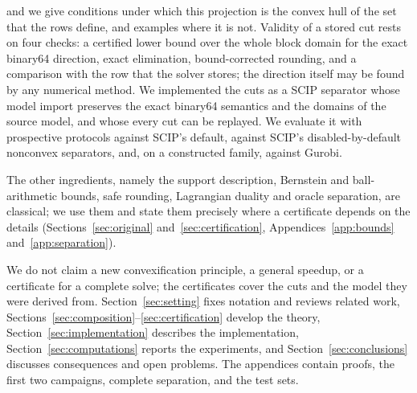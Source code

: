 \begin{itemize}
and we give conditions under which this projection is the convex hull of the
set that the rows define, and examples where it is not. Validity of a stored
cut rests on four checks: a certified lower bound over the whole block domain
for the exact binary64 direction, exact elimination, bound-corrected rounding,
and a comparison with the row that the solver stores; the direction itself may
be found by any numerical method. We implemented the cuts as a SCIP separator
whose model import preserves the exact binary64 semantics and the domains of
the source model, and whose every cut can be replayed. We evaluate it with
prospective protocols against SCIP's default, against SCIP's
disabled-by-default nonconvex separators, and, on a constructed family,
against Gurobi.
\end{itemize}

The other ingredients, namely the support description, Bernstein and
ball-arithmetic bounds, safe rounding, Lagrangian duality and oracle
separation, are classical; we use them and state them precisely where a
certificate depends on the details (Sections~\ref{sec:original}
and~\ref{sec:certification}, Appendices~\ref{app:bounds}
and~\ref{app:separation}).



We do not claim a new convexification principle, a general speedup, or a
certificate for a complete solve; the certificates cover the cuts and the
model they were derived from. Section~\ref{sec:setting} fixes notation and
reviews related work, Sections~\ref{sec:composition}--\ref{sec:certification}
develop the theory, Section~\ref{sec:implementation} describes the
implementation, Section~\ref{sec:computations} reports the experiments, and
Section~\ref{sec:conclusions} discusses consequences and open problems. The
appendices contain proofs, the first two campaigns, complete separation, and
the test sets.
